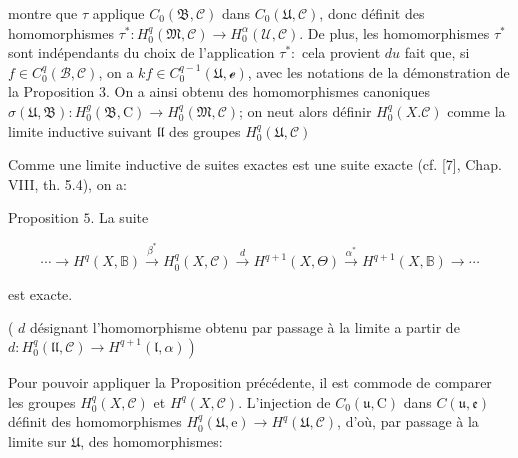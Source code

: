 montre que $\tau$ applique $C_{0}(\mathfrak{B}, \mathcal{C})$ dans $C_{0}(\mathfrak{U}, \mathcal{C})$, donc définit des homomorphismes $\tau^{*}: H_{0}^{q}(\mathfrak{M}, \mathcal{C}) \rightarrow H_{0}^{\alpha}(\mathcal{U}, \mathcal{C}) .$ De plus, les homomorphismes $\tau^{*}$ sont indépendants du choix de l'application $\tau^{*}:$ cela provient $d u$ fait que, si $f \in C_{0}^{q}(\mathscr{B}, \mathcal{C})$, on a $k f \in C_{0}^{q-1}(\mathfrak{U}, \mathcal{e})$, avec les notations de la démonstration de la Proposition 3. On a ainsi obtenu des homomorphismes canoniques $\sigma(\mathfrak{U}, \mathfrak{B}): H_{0}^{g}(\mathfrak{B}, \mathrm{C}) \rightarrow H_{0}^{q}(\mathfrak{M}, \mathcal{C})$; on neut alors définir $H_{0}^{q}(X . \mathcal{C})$ comme la limite inductive suivant $\mathfrak{l l}$ des groupes $H_{0}^{q}(\mathfrak{U}, \mathcal{C})$


Comme une limite inductive de suites exactes est une suite exacte (cf. [7], Chap. VIII, th. 5.4), on a:

Proposition $5 .$ La suite

$$
\cdots \rightarrow H^{q}(X, \mathbb{B}) \stackrel{\beta^{*}}{\rightarrow} H_{0}^{q}(X, \mathcal{C}) \stackrel{d}{\rightarrow} H^{q+1}(X, \Theta) \stackrel{\alpha^{*}}{\rightarrow} H^{q+1}(X, \mathbb{B}) \rightarrow \cdots
$$

est exacte.

( $d$ désignant l'homomorphisme obtenu par passage à la limite a partir de $\left.d: H_{0}^{q}(\mathfrak{l l}, \mathcal{C}) \rightarrow H^{q+1}(\mathfrak{l}, \alpha)\right)$

Pour pouvoir appliquer la Proposition précédente, il est commode de comparer les groupes $H_{0}^{q}(X, \mathcal{C})$ et $H^{q}(X, \mathcal{C}) .$ L'injection de $C_{0}(\mathfrak{u}, \mathrm{C})$ dans $C(\mathfrak{u}, \mathfrak{e})$ définit des homomorphismes $H_{0}^{q}(\mathfrak{U}, \mathrm{e}) \rightarrow H^{q}(\mathfrak{U}, \mathcal{C})$, d'où, par passage à la limite sur $\mathfrak{U}$, des homomorphismes:

